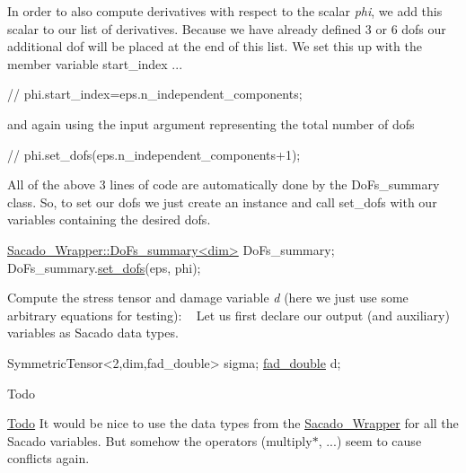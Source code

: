 In order to also compute derivatives with respect to the scalar {\itshape phi}, we add this scalar to our list of derivatives. Because we have already defined 3 or 6 dofs our additional dof will be placed at the end of this list. We set this up with the member variable start\+\_\+index ... 
\begin{DoxyCode}
\textcolor{comment}{//    phi.start\_index=eps.n\_independent\_components;}
\end{DoxyCode}
 and again using the input argument representing the total number of dofs 
\begin{DoxyCode}
\textcolor{comment}{//    phi.set\_dofs(eps.n\_independent\_components+1);}
\end{DoxyCode}
 All of the above 3 lines of code are automatically done by the Do\+Fs\+\_\+summary class. So, to set our dofs we just create an instance and call set\+\_\+dofs with our variables containing the desired dofs. 
\begin{DoxyCode}
\hyperlink{classSacado__Wrapper_1_1DoFs__summary}{Sacado\_Wrapper::DoFs\_summary<dim>} DoFs\_summary;
DoFs\_summary.\hyperlink{classSacado__Wrapper_1_1DoFs__summary_a556293f6e683cb30151d9faadc2cc90d}{set\_dofs}(eps, phi);
\end{DoxyCode}
 Compute the stress tensor and damage variable {\itshape d} (here we just use some arbitrary equations for testing)\+: ~\newline
Let us first declare our output (and auxiliary) variables as Sacado data types. 
\begin{DoxyCode}
SymmetricTensor<2,dim,fad\_double> sigma;
\hyperlink{Sacado__example_8cc_a868b94676739e612d9c95940e70892a9}{fad\_double} d;
\end{DoxyCode}
 \begin{DoxyRefDesc}{Todo}
\item[\hyperlink{todo__todo000005}{Todo}]It would be nice to use the data types from the \hyperlink{namespaceSacado__Wrapper}{Sacado\+\_\+\+Wrapper} for all the Sacado variables. But somehow the operators (multiply$\ast$, ...) seem to cause conflicts again.\end{DoxyRefDesc}


